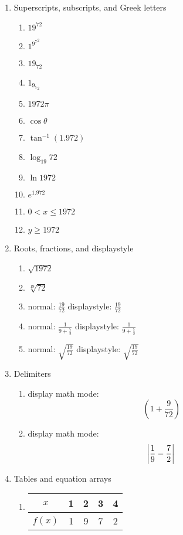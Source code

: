 \documentclass[12pt]{article}
\begin{document}
\begin{enumerate}
    \item Superscripts, subscripts, and Greek letters
    \begin{enumerate}
        \item $19^{72}$
        \item $1^{{{{9}^{7}}^{2}}}$
        \item $19_{72}$
        \item $1_{{{9}_{7}}_{2}}$
        \item $1972{\pi}$
        \item $\cos \theta$
        \item $\tan^{-1}(1.972)$
        \item $\log_{19}72$
        \item $\ln 1972$
        \item $e^{1.972}$
        \item $0 < x \leq 1972$
        \item $y \geq 1972$
    \end{enumerate}

    \item Roots, fractions, and displaystyle
    \begin{enumerate}
        \item $\sqrt{1972}$
        \item $\sqrt[19]{72}$
        \item normal: $\frac{19}{72}$ displaystyle: $\displaystyle \frac{19}{72}$
        \item normal: $\frac{1}{9 + \frac{7}{2}}$ displaystyle: $\displaystyle \frac{1}{9 + \frac{7}{2}}$
        \item normal: $\sqrt{\frac{19}{72}}$ displaystyle: $\displaystyle \sqrt{\frac{19}{72}}$
    \end{enumerate}

    \item Delimiters
    \begin{enumerate}
        \item display math mode:
            \begin{equation}
                (1+\frac{9}{72}) \nonumber
            \end{equation}
        \item display math mode: 
            \begin{equation}
                \left|
                    \frac{1}{9}-\frac{7}{2}\right| \nonumber\\
            \end{equation}
    \end{enumerate}
    \item Tables and equation arrays
    \begin{enumerate}
        \item
        \begin{tabular}{|c|c|c|c|c|}
        \hline
        $x$ & 1 & 2 & 3 & 4 \\
        \hline
        $f(x)$ & 1 & 9 & 7 & 2 \\
        \hline
        \end{tabular}


\end{enumerate}
\end{enumerate}
\end{document}
